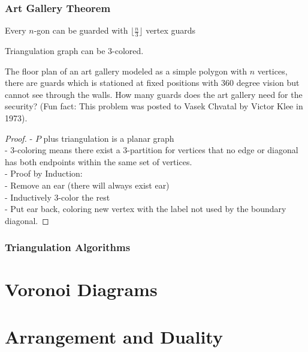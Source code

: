 			\subsection{Art Gallery Theorem}
				\begin{theorem}
					Every $n$-gon can be guarded with $\lfloor \frac{n}{3} \rfloor$ vertex guards
				\end{theorem}

				\begin{lemma}
					Triangulation graph can be 3-colored.
				\end{lemma}

				\begin{problem}
					The floor plan of an art gallery modeled as a simple polygon with $n$ vertices, there are guards which is stationed at fixed positions with 360 degree vision but cannot see through the walls. How many guards does the art gallery need for the security? (Fun fact: This problem was posted to Vasek Chvatal by Victor Klee in 1973).				
				\end{problem}

				\begin{proof}
					- $P$ plus triangulation is a planar graph\\
					- 3-coloring means there exist a 3-partition for vertices that no edge or diagonal has both endpoints within the same set of vertices.\\
					- Proof by Induction:\\
					\indent - Remove an ear (there will always exist ear) \\
					\indent - Inductively 3-color the rest\\
					\indent - Put ear back, coloring new vertex with the label not used by the boundary diagonal.
				\end{proof}

			\subsection{Triangulation Algorithms}

	\chapter{Voronoi Diagrams}

	\chapter{Arrangement and Duality}

